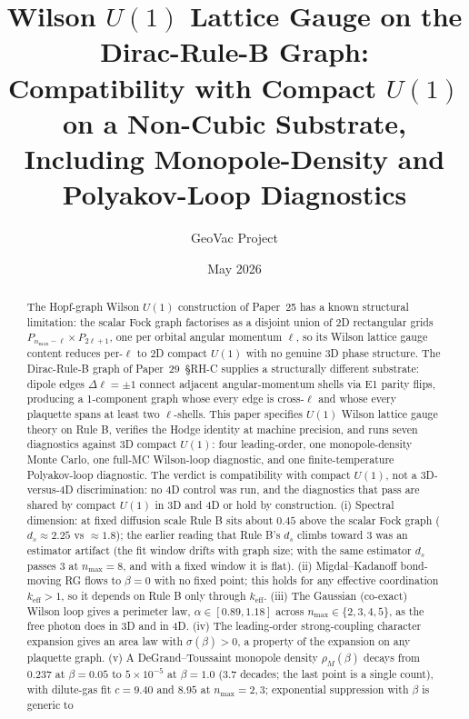 \documentclass[11pt]{article}
\title{Wilson $U(1)$ Lattice Gauge on the Dirac-Rule-B Graph:\\
Compatibility with Compact $U(1)$ on a Non-Cubic Substrate,\\
Including Monopole-Density and Polyakov-Loop Diagnostics}
\author{GeoVac Project}
\date{May 2026}
\begin{document}
\maketitle

\begin{abstract}
The Hopf-graph Wilson $U(1)$ construction of Paper~25 has a known structural
limitation: the scalar Fock graph factorises as a disjoint union of 2D
rectangular grids $P_{n_\text{max}-\ell}\times P_{2\ell+1}$, one per orbital
angular momentum $\ell$, so its Wilson lattice gauge content reduces per-$\ell$
to 2D compact $U(1)$ with no genuine 3D phase structure. The Dirac-Rule-B graph
of Paper~29~\S{}RH-C supplies a structurally different substrate: dipole edges
$\Delta\ell=\pm 1$ connect adjacent angular-momentum shells via E1 parity flips,
producing a 1-component graph whose every edge is cross-$\ell$ and whose every
plaquette spans at least two $\ell$-shells. This paper specifies $U(1)$ Wilson
lattice gauge theory on Rule B, verifies the Hodge identity at machine precision,
and runs seven diagnostics against 3D compact $U(1)$: four leading-order,
one monopole-density Monte Carlo, one full-MC Wilson-loop diagnostic, and one
finite-temperature Polyakov-loop diagnostic.  The verdict is compatibility
with compact $U(1)$, not a 3D-versus-4D discrimination: no 4D control was
run, and the diagnostics that pass are shared by compact $U(1)$ in 3D and 4D
or hold by construction.  (i) Spectral dimension: at fixed diffusion scale
Rule B sits about $0.45$ above the scalar Fock graph ($d_s \approx 2.25$ vs
$\approx 1.8$); the earlier reading that Rule B's $d_s$ climbs toward 3 was an
estimator artifact (the fit window drifts with graph size; with the same
estimator $d_s$ passes 3 at $n_\text{max} = 8$, and with a fixed window it is
flat).  (ii) Migdal--Kadanoff bond-moving RG flows to $\beta = 0$ with no
fixed point; this holds for any effective coordination $k_\text{eff} > 1$,
so it depends on Rule B only through $k_\text{eff}$.  (iii) The Gaussian
(co-exact) Wilson loop gives a perimeter law, $\alpha \in [0.89, 1.18]$
across $n_\text{max} \in \{2,3,4,5\}$, as the free photon does in 3D and in
4D.  (iv) The leading-order strong-coupling character expansion gives an area
law with $\sigma(\beta) > 0$, a property of the expansion on any plaquette
graph.  (v) A DeGrand--Toussaint monopole density $\rho_M(\beta)$ decays from
$0.237$ at $\beta = 0.05$ to $5\times 10^{-5}$ at $\beta = 1.0$ (3.7 decades;
the last point is a single count), with dilute-gas fit $c = 9.40$ and $8.95$
at $n_\text{max} = 2, 3$; exponential suppression with $\beta$ is generic to

\end{abstract}
\end{document}
